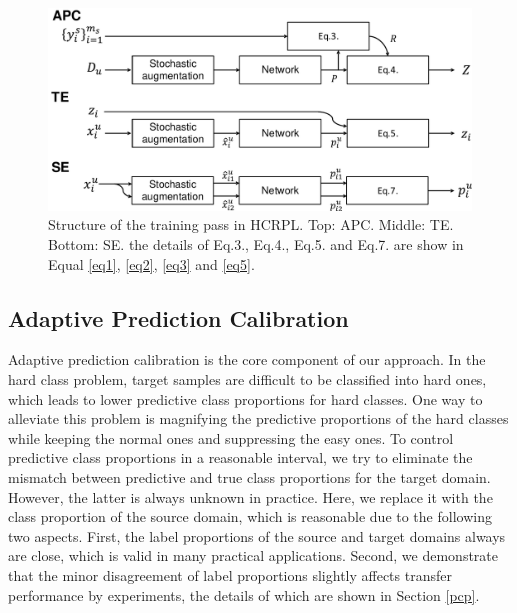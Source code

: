 \documentclass[a4paper,fleqn]{cas-dc}
\begin{document}
	
	\begin{figure}
		\centering
		\includegraphics[width=6.9in]{figs/process.pdf}
		\caption{Structure of the training pass in HCRPL. Top: APC. Middle: TE. Bottom: SE. the details of Eq.3., Eq.4., Eq.5. and Eq.7. are show in  Equal \ref{eq1}, \ref{eq2}, \ref{eq3} and \ref{eq5}.
		}\label{fig3}
	\end{figure}
	
	\subsection{Adaptive Prediction Calibration}
	Adaptive prediction calibration is the core component of our approach. In the hard class problem, target samples are difficult to be classified into hard ones, which leads to lower predictive class proportions for hard classes. One way to alleviate this problem is magnifying the predictive proportions of the hard classes while keeping the normal ones and suppressing the easy ones. To control predictive class proportions in a reasonable interval, we try to eliminate the mismatch between predictive and true class proportions for the target domain. However, the latter is always unknown in practice. Here, we replace it with the class proportion of the source domain, which is reasonable due to the following two aspects. First, the label proportions of the source and target domains always are close, which is valid in many practical applications. Second, we demonstrate that the minor disagreement of label proportions slightly affects transfer performance by experiments, the details of which are shown in Section \ref{pcp}.
	
\end{document}
